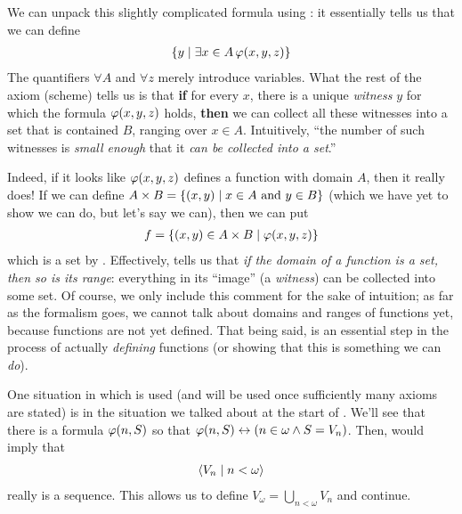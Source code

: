 We can unpack this slightly complicated formula using : it essentially tells us that we can define
\begin{align*}
    \left\{ y \; \middle\vert \; \exists x \in A \, \varphi\!\left( x, y, z \right) \right\}
\end{align*}
The quantifiers $\forall A$ and $\forall z$ merely introduce variables. What the rest of the axiom (scheme) tells us is that \textbf{if} for every $x$, there is a unique \textit{witness} $y$ for which the formula $\varphi\!\left( x, y, z \right)$ holds, \textbf{then} we can collect all these witnesses into a set that is contained $B$, ranging over $x \in A$. Intuitively, ``the number of such witnesses is \textit{small enough} that it \textit{can be collected into a set}.''

Indeed, if it looks like $\varphi\!\left( x, y, z \right)$ defines a function with domain $A$, then it really does! If we can define $A \times B = \left\{ \left( x, y \right) \; \middle\vert \; x \in A \text{ and } y \in B \right\}$ (which we have yet to show we can do, but let's say we can), then we can put
\begin{align*}
    f = \left\{ \left( x, y \right) \in A \times B \; \middle\vert \; \varphi\!\left( x, y, z \right) \right\}
\end{align*}
which is a set by . Effectively,  tells us that \textit{if the domain of a function is a set, then so is its range}: everything in its ``image'' (a \textit{witness}) can be collected into some set. Of course, we only include this comment for the sake of intuition; as far as the formalism goes, we cannot talk about domains and ranges of functions yet, because functions are not yet defined. That being said,  is an essential step in the process of actually \textit{defining} functions (or showing that this is something we can \textit{do}).

One situation in which  is used (and will be used once sufficiently many axioms are stated) is in the situation we talked about at the start of . We'll see that there is a formula $\varphi\!\left( n, S \right)$ so that $\varphi\!\left( n, S \right) \leftrightarrow \left( n \in \omega \land S = V_n \right)$. Then,  would imply that
\begin{align*}
    \left\langle V_n \; \middle| \; n < \omega \right\rangle
\end{align*}
really is a sequence. This allows us to define $V_\omega = \bigcup_{n < \omega} V_n$ and continue.



